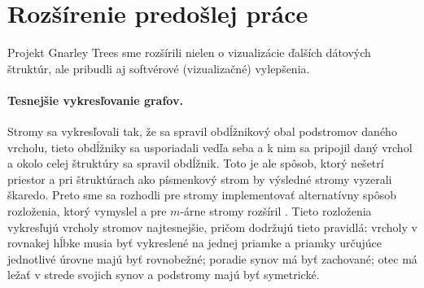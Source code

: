 \section{Rozšírenie predošlej práce}

Projekt Gnarley Trees sme rozšírili nielen o vizualizácie ďalších dátových
štruktúr, ale pribudli aj softvérové (vizualizačné) vylepšenia.



\paragraph{Tesnejšie vykresľovanie grafov.}
Stromy sa vykresľovali tak, že sa spravil obdĺžnikový obal podstromov daného 
vrcholu, tieto obdĺžniky sa usporiadali vedľa seba a k nim sa pripojil daný 
vrchol a okolo celej štruktúry sa spravil obdĺžnik. Toto je ale spôsob, ktorý 
nešetrí priestor a pri štruktúrach ako písmenkový strom by výsledné stromy 
vyzerali škaredo. Preto sme sa rozhodli pre stromy implementovať 
alternatívny spôsob rozloženia, ktorý vymyslel \citet{reingold} a pre $m$-árne 
stromy rozšíril \citet{walker}. Tieto rozloženia vykresľujú vrcholy stromov 
najtesnejšie, pričom dodržujú tieto pravidlá: vrcholy v rovnakej hĺbke musia 
byť vykreslené na jednej priamke a priamky určujúce jednotlivé úrovne majú byť 
rovnobežné; poradie synov má byť zachované; otec má ležať v strede svojich 
synov a podstromy majú byť symetrické.

